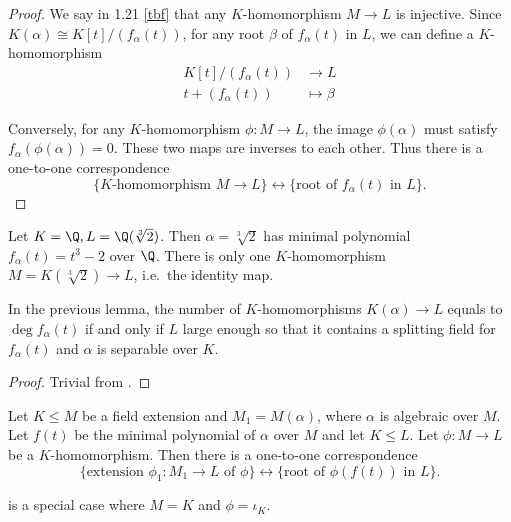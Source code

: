 \documentclass[a4paper]{article}
\begin{document}
\begin{proof}
  We say in 1.21 \ref{tbf} that any \(K\)-homomorphism \(M \to L\) is injective. Since \(K(\alpha) \cong K[t]/(f_\alpha(t))\), for any root \(\beta\) of \(f_\alpha(t)\) in \(L\), we can define a \(K\)-homomorphism
  \begin{align*}
    K[t]/(f_\alpha(t)) &\to L \\
    t + (f_\alpha(t)) &\mapsto \beta
  \end{align*}

  Conversely, for any \(K\)-homomorphism \(\phi: M \to L\), the image \(\phi(\alpha)\) must satisfy \(f_\alpha(\phi(\alpha)) = 0\). These two maps are inverses to each other. Thus there is a one-to-one correspondence
  \[
    \{K\text{-homomorphism } M \to L\} \leftrightarrow \{\text{root of } f_\alpha(t) \text{ in } L\}.
  \]
\end{proof}

\begin{eg}
  Let \(K = \Q, L = \Q(\sqrt[3]{2})\). Then \(\alpha = \sqrt[3]{2}\) has minimal polynomial \(f_\alpha(t) = t^3 - 2\) over \(\Q\). There is only one \(K\)-homomorphism \(M = K(\sqrt[3]{2}) \to L\), i.e.\ the identity map.
\end{eg}

\begin{corollary}
  In the previous lemma, the number of \(K\)-homomorphisms \(K(\alpha) \to L\) equals to \(\deg f_\alpha(t)\) if and only if \(L\) large enough so that it contains a splitting field for \(f_\alpha(t)\) and \(\alpha\) is separable over \(K\).
\end{corollary}

\begin{proof}
  Trivial from .
\end{proof}

\begin{lemma}
  \label{lem:homomorphic extension of algebraic extension}
  Let \(K \leq M\) be a field extension and \(M_1 = M(\alpha)\), where \(\alpha\) is algebraic over \(M\). Let \(f(t)\) be the minimal polynomial of \(\alpha\) over \(M\) and let \(K \leq L\). Let \(\phi: M \to L\) be a \(K\)-homomorphism. Then there is a one-to-one correspondence
  \[
    \{\text{extension } \phi_1: M_1 \to L \text{ of } \phi\} \leftrightarrow \{\text{root of } \phi(f(t)) \text{ in } L\}.
  \]
\end{lemma}

\begin{remark}
   is a special case where \(M = K\) and \(\phi = \iota_K\).
\end{remark}
\end{document}
